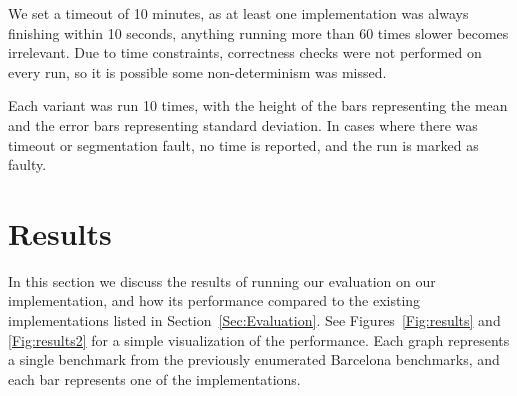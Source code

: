 \documentclass[sigconf]{acmart}
\begin{document}
We set a timeout of 10 minutes, as at least one implementation was always
finishing within 10 seconds, anything running more than 60 times slower becomes
irrelevant. Due to time constraints, correctness checks were not performed on
every run, so it is possible some non-determinism was missed. 

Each variant was run 10 times, with the height of the bars representing the
mean and the error bars representing standard deviation. In cases where there
was timeout or segmentation fault, no time is reported, and the run is marked
as faulty. 

\section{Results} \label{Sec:Results}

In this section we discuss the results of running our evaluation on our
implementation, and how its performance compared to the existing
implementations listed in Section~\ref{Sec:Evaluation}. See
Figures~\ref{Fig:results} and \ref{Fig:results2} for a simple visualization of
the performance. Each graph represents a single benchmark from the previously
enumerated Barcelona benchmarks, and each bar represents one of the
implementations. 
\end{document}
